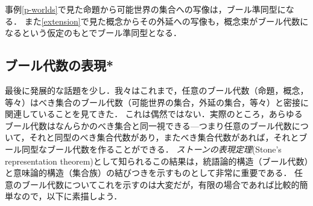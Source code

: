 \documentclass[11pt,a4paper, dvipdfmx]{jsarticle}
\begin{document}
\begin{example}
    事例\ref{p-worlds}で見た命題から可能世界の集合への写像は，ブール準同型になる．
    また\ref{extension}で見た概念からその外延への写像も，概念束がブール代数になるという仮定のもとでブール準同型となる．
\end{example}





\subsection{ブール代数の表現*}

最後に発展的な話題を少し．我々はこれまで，任意のブール代数（命題，概念，等々）はべき集合のブール代数（可能世界の集合，外延の集合，等々）と密接に関連していることを見てきた．
これは偶然ではない．実際のところ，あらゆるブール代数はなんらかのべき集合と同一視できる---つまり任意のブール代数について，それと同型のべき集合代数があり，またべき集合代数があれば，それとブール同型なブール代数を作ることができる．
\emph{ストーンの表現定理}(Stone's representation theorem)として知られるこの結果は，統語論的構造（ブール代数）と意味論的構造（集合族）の結びつきを示すものとして非常に重要である．
任意のブール代数についてこれを示すのは大変だが，有限の場合であれば比較的簡単なので，以下に素描しよう．
\end{document}
